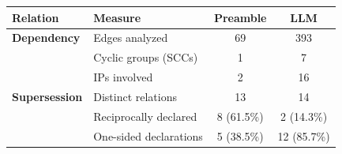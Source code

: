 {%
    \setlength{\abovetopsep}{0pt}%
    \setlength{\belowbottomsep}{0pt}%
    \setlength{\aboverulesep}{0pt}%
    \setlength{\belowrulesep}{0pt}%
    \setlength{\tabcolsep}{7pt}%
    \renewcommand{\arraystretch}{1.15}%
    \begin{tabular}{ll|cc}
        \toprule
        \textbf{Relation} & \textbf{Measure} & \textbf{Preamble} & \textbf{LLM} \\
        \midrule%
        \textbf{Dependency} & Edges analyzed & 69 & 393 \\
         & Cyclic groups (SCCs) & 1 & 7 \\
         & IPs involved & 2 & 16 \\
        \midrule%
        \textbf{Supersession} & Distinct relations & 13 & 14 \\
         & Reciprocally declared & 8 (61.5\%) & 2 (14.3\%) \\
         & One-sided declarations & 5 (38.5\%) & 12 (85.7\%) \\
        \bottomrule
    \end{tabular}%
}
